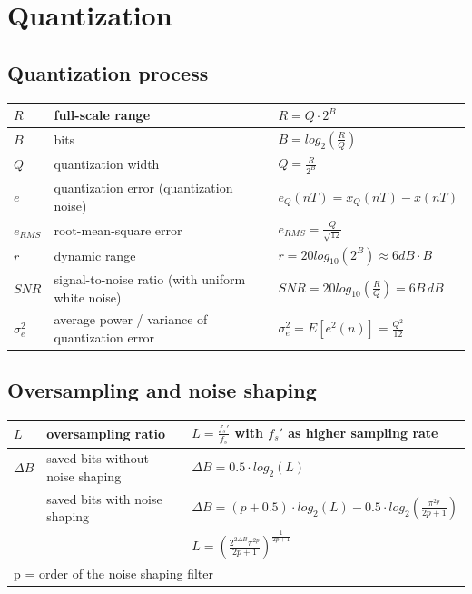 \section{Quantization}

\subsection{Quantization process}
\begin{tabularx}{\textwidth}{|l|X|X|}
	\hline
	$R$			& full-scale range		& $R = Q \cdot 2^B$
	\\ \hline
	$B$			& bits					& $B = log_2 \left(\frac{R}{Q}\right)$
	\\ \hline
	$Q$			& quantization width	& $Q = \frac{R}{2^B}$
	\\ \hline
	$e$			& quantization error (quantization noise)	& $e_Q(nT) = x_Q(nT) -x(nT)$
	\\ \hline
	$e_{RMS}$	& root-mean-square error & $e_{RMS} = \frac{Q}{\sqrt{12}}$
	\\ \hline
	$r$	        & dynamic range         & $r = 20 log_{10}\left(2^B\right) \approx 6dB \cdot B$
	\\ \hline
	$SNR$		& signal-to-noise ratio (with uniform white noise)	& $SNR = 20 log_{10}\left(\frac{R}{Q}\right) = 6B\, dB$
	\\ \hline
	$\sigma_e^2$& average power / variance of quantization error & $\sigma_e^2 = E[e^2(n)] = \frac{Q^2}{12}$
	\\ \hline
\end{tabularx}


\subsection{Oversampling and noise shaping}
\begin{tabularx}{0.75\textwidth}{|l|l|X|}
	\hline
	$L$	& oversampling ratio	& $L = \frac{f_s'}{f_s}$ with $f_s'$ as higher sampling rate
	\\ \hline
	$\Delta B$	& saved bits without noise shaping	& $\Delta B = 0.5 \cdot log_2(L)$ \\
				& saved bits with noise shaping		& $\Delta B = (p + 0.5) \cdot log_2(L) - 0.5 \cdot log_2\left(\frac{\pi^{2p}}{2p + 1}\right)$ \\
				& & $L = \left(\frac{2^{2\Delta B} \pi^{2p}}{2p+1}\right)^{\frac{1}{2p+1}}$	
	\\ \hline
	\multicolumn{3}{l}{p = order of the noise shaping filter}
\end{tabularx}



